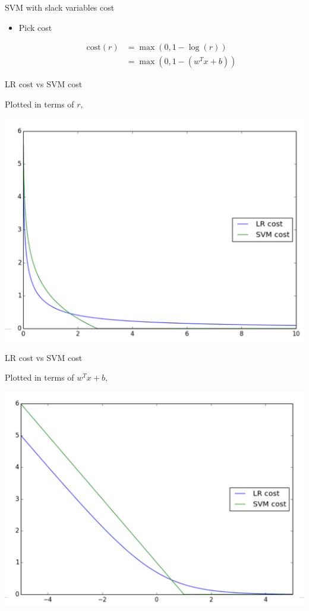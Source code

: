 \documentclass[12pt,notes,mathserif]{beamer}
\providecommand{\tightlist}{%
	\setlength{\itemsep}{0pt}\setlength{\parskip}{0pt}}
\begin{document}
\begin{frame}{SVM with slack variables cost}

\begin{itemize}
\tightlist
\item
  Pick cost

  \begin{align*}
  \textrm{cost}(r) & = \max(0,1-\log(r))\\
  &=\max(0,1-(w^{T}x+b))
  \end{align*}
\end{itemize}

\end{frame}

\begin{frame}{LR cost vs SVM cost}

Plotted in terms of \(r,\)

\begin{center}
\includegraphics[width=.9\textwidth]{2018-04-15-20-10-15.png}
\end{center}

\end{frame}

\begin{frame}{LR cost vs SVM cost}

Plotted in terms of \(w^{T}x+b,\)

\begin{center}
\includegraphics[width=.9\textwidth]{2018-04-15-20-10-37.png}
\end{center}

\end{frame}
\end{document}

